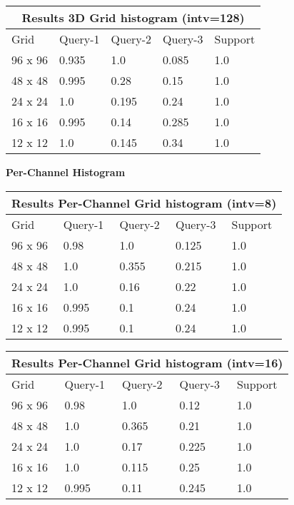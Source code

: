 \documentclass[12pt]{article}
\begin{document}
\begin{tabular}{ |p{1.5cm}||p{2cm}|p{2cm}|p{2cm}|p{2cm}|  }
    \hline
    \multicolumn{5}{|c|}{Results 3D Grid histogram (intv=128)} \\
    \hline
    Grid & Query-1 & Query-2 & Query-3 & Support \\
    \hline
    96 x 96 & 0.935 & 1.0 & 0.085 & 1.0 \\
    \hline
    48 x 48 & 0.995 & 0.28 & 0.15 & 1.0 \\
    \hline
    24 x 24 & 1.0 & 0.195 & 0.24 & 1.0 \\
    \hline
    16 x 16 & 0.995 & 0.14 & 0.285 & 1.0 \\
    \hline
    12 x 12 & 1.0 & 0.145 & 0.34 & 1.0 \\
    \hline
\end{tabular}

\pagebreak

\textbf{Per-Channel Histogram} \\ 

\begin{tabular}{ |p{1.5cm}||p{2cm}|p{2cm}|p{2cm}|p{2cm}|  }
    \hline
    \multicolumn{5}{|c|}{Results Per-Channel Grid histogram (intv=8)} \\
    \hline
    Grid & Query-1 & Query-2 & Query-3 & Support \\
    \hline
    96 x 96 & 0.98 & 1.0 & 0.125 & 1.0 \\
    \hline
    48 x 48 & 1.0 & 0.355 & 0.215 & 1.0 \\
    \hline
    24 x 24 & 1.0 & 0.16 & 0.22 & 1.0 \\
    \hline
    16 x 16 & 0.995 & 0.1 & 0.24 & 1.0 \\
    \hline
    12 x 12 & 0.995 & 0.1 & 0.24 & 1.0 \\
    \hline
\end{tabular}

\begin{tabular}{ |p{1.5cm}||p{2cm}|p{2cm}|p{2cm}|p{2cm}|  }
    \hline
    \multicolumn{5}{|c|}{Results Per-Channel Grid histogram (intv=16)} \\
    \hline
    Grid & Query-1 & Query-2 & Query-3 & Support \\
    \hline
    96 x 96 & 0.98 & 1.0 & 0.12 & 1.0 \\
    \hline
    48 x 48 & 1.0 & 0.365 & 0.21 & 1.0 \\
    \hline
    24 x 24 & 1.0 & 0.17 & 0.225 & 1.0 \\
    \hline
    16 x 16 & 1.0 & 0.115 & 0.25 & 1.0 \\
    \hline
    12 x 12 & 0.995 & 0.11 & 0.245 & 1.0 \\
    \hline
\end{tabular}
\end{document}
